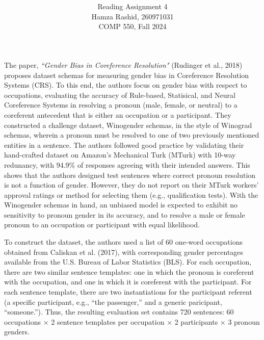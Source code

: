 \documentclass[11pt]{article}
\title{ }
\author{ Reading Assignment 4 \\ Hamza Rashid, 260971031 \\ COMP 550, Fall 2024}
\date{}
\begin{document}
\maketitle

\vspace{-4ex}
The paper, \textit{``Gender Bias in Coreference Resolution"} 
(Rudinger et al., 2018) proposes dataset schemas for measuring 
gender bias in Coreference Resolution Systems (CRS). To this end, 
the authors focus on gender bias with respect to occupations, 
evaluating the accuracy of Rule-based, Statisical, and Neural 
Coreference Systems in resolving a pronoun (male, female, or neutral) 
to a coreferent antecedent that is either an occupation or a participant. 
They constructed a challenge dataset, Winogender schemas, 
in the style of Winograd schemas, wherein a pronoun must be resolved to one of two previously mentioned 
entities in a sentence. The authors followed good practice 
by validating their hand-crafted dataset on Amazon's Mechanical Turk (MTurk) with 10-way
redunancy, with 94.9\% of responses agreeing with their intended answers. This shows that
the authors designed test sentences where correct pronoun resolution is not a function of gender. However,
they do not report on their MTurk workers' approval ratings or method for selecting them 
(e.g., qualification tests). With the Winogender schemas in hand, an unbiased model is expected to
exhibit no sensitivity to pronoun gender in its accuracy, and to resolve a male or female 
pronoun to an occupation or participant with equal likelihood. 


To construct the dataset, the authors 
used a list of 60 one-word occupations obtained from Caliskan et al. (2017), 
with corresponding gender percentages
available from the U.S. Bureau of Labor Statistics (BLS). For each occupation, there are two similar
sentence templates: one in which the pronoun is
coreferent with the occupation, and one in which
it is coreferent with the participant.
For each sentence template, there are two instantiations for the participant referent (a specific
participant, e.g., “the passenger,” and a generic
paricipant, “someone.”). Thus, the resulting evaluation set contains 720 sentences: 60 occupations × 2 sentence templates per
occupation × 2 participants × 3 pronoun genders.
\end{document}
